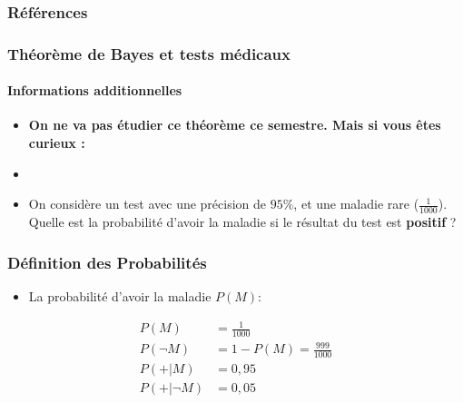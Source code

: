 \documentclass[xcolor=dvipsnames, mathserif, 10pt, aspectratio=169, handout]{beamer}
\begin{document}
\appendix
\begin{frame}[allowframebreaks]

{
\footnotesize
        \frametitle{Références}
        
          

}

\end{frame}





\appendix


\begin{frame}
  \frametitle{Théorème de Bayes et tests médicaux}
  \framesubtitle{Informations additionnelles}
  \label{bayes}
  
  \begin{itemize}
  	\item \textbf{On ne va pas étudier ce théorème ce semestre. Mais si vous êtes curieux :}
  	\item[]
  	\item[]   On considère un test avec une précision de \(95\%\), et une maladie rare (\(\frac{1}{1000}\)). 
  Quelle est la probabilité d'avoir la maladie si le résultat du test est \textbf{positif} ?
 
  \end{itemize}
  
  
\vfill
\vfill  


\end{frame}




\begin{frame}
  \frametitle{Définition des Probabilités}
  
  \begin{itemize}
  	\item La probabilité d'avoir la maladie $P(M)$:
  \end{itemize}
  
  \begin{align*}
    P(M)      &= \frac{1}{1000} \\
    P(\neg M) &= 1 - P(M) = \frac{999}{1000} \\
    P(+|M)    &= 0,95 \\
    P(+|\neg M) &= 0,05
  \end{align*}
  
  \vfill
\vfill  



\end{frame}
\end{document}
